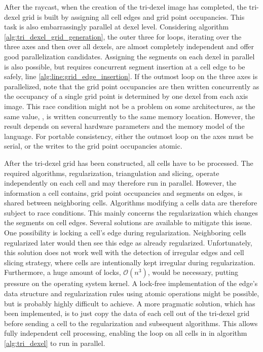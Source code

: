 After the raycast, when the creation of the tri-dexel image has completed, the tri-dexel grid is built by assigning all cell edges and grid point occupancies.
This task is also embarrassingly parallel at dexel level.
Considering algorithm \ref{alg:tri_dexel_grid_generation}, the outer three for loops, iterating over the three axes and then over all dexels, are almost completely independent and offer good parallelization candidates.
Assigning the segments on each dexel in parallel is also possible, but requires concurrent segment insertion at a cell edge to be safely, \cf line \ref{alg:line:grid_edge_insertion}.
If the outmost loop on the three axes is parallelized, note that the grid point occupancies are then written concurrently as the occupancy of a single grid point is determined by one dexel from each axis image.
This race condition might not be a problem on some architectures, as the same value, \True, is written concurrently to the same memory location.
However, the result depends on several hardware parameters and the memory model of the language.
For portable consistency, either the outmost loop on the axes must be serial, or the writes to the grid point occupancies atomic.

After the tri-dexel grid has been constructed, all cells have to be processed.
The required algorithms, \ie regularization, triangulation and slicing, operate independently on each cell and may therefore run in parallel.
However, the information a cell contains, \ie grid point occupancies and segments on edges, is shared between neighboring cells.
Algorithms modifying a cells data are therefore subject to race conditions.
This mainly concerns the regularization which changes the segments on cell edges.
Several solutions are available to mitigate this issue.
One possibility is locking a cell's edge during regularization.
Neighboring cells regularized later would then see this edge as already regularized.
Unfortunately, this solution does not work well with the detection of irregular edges and cell slicing strategy, where cells are intentionally kept irregular during regularization.
Furthermore, a huge amount of locks, $\mathcal{O}(n^3)$, would be necessary, putting pressure on the operating system kernel.
A lock-free implementation of the edge's data structure and regularization rules using atomic operations might be possible, but is probably highly difficult to achieve.
A more pragmatic solution, which has been implemented, is to just copy the data of each cell out of the tri-dexel grid before sending a cell to the regularization and subsequent algorithms.
This allows fully independent cell processing, enabling the loop on all cells in  in algorithm \ref{alg:tri_dexel} to run in parallel.

